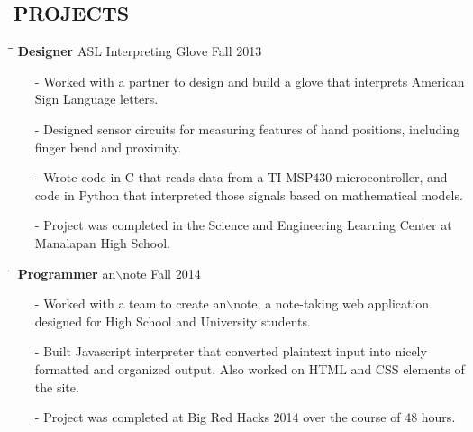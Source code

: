 \documentclass{res}
\begin{document}
\begin{resume}
    
\section{PROJECTS}    
	\vspace{-5pt}
	\begin{tabbing}
    \hspace{2.3in}\= \hspace{2.4in}\= \kill
    {\bf Designer} \>ASL Interpreting Glove \>Fall 2013\\
  \end{tabbing}\vspace{-15pt}
  \begin{itemize}[leftmargin=*, nolistsep]
    \item[-] Worked with a partner to design and build a glove that interprets American Sign Language letters.
    \item[-] Designed sensor circuits for measuring features of hand positions, including finger bend and proximity.
    \item[-] Wrote code in C that reads data from a TI-MSP430 microcontroller, and code in Python that interpreted those signals based on mathematical models.
    \item[-] Project was completed in the Science and Engineering Learning Center at Manalapan High School.
  \end{itemize}
  \vspace{-10pt}
  \begin{tabbing}
    \hspace{2.3in}\= \hspace{2.4in}\= \kill
    {\bf Programmer} \>an$\backslash$note \>Fall 2014\\
  \end{tabbing}\vspace{-15pt}
  \begin{itemize}[leftmargin=*, nolistsep]
    \item[-] Worked with a team to create an$\backslash$note, a note-taking web application designed for High School and University students.
    \item[-] Built Javascript interpreter that converted plaintext input into nicely formatted and organized output. Also worked on HTML and CSS elements of the site.
    \item[-] Project was completed at Big Red Hacks 2014 over the course of 48 hours.
  \end{itemize}
  \vspace{-10pt}
  \begin{tabbing}

\end{tabbing}
\end{resume}
\end{document}
